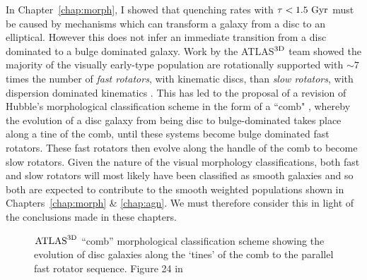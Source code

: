 In Chapter~\ref{chap:morph}, I showed that quenching rates with $\tau < 1.5~\rm{Gyr}$ must be caused by mechanisms which can transform a galaxy from a disc to an elliptical. However this does not infer an immediate transition from a disc dominated to a bulge dominated galaxy. Work by the \textsc{ATLAS}$^{\rm{3D}}$ team \citep{cappellari11} showed the majority of the visually early-type population are rotationally supported \citep{emsellem11} with $\sim7$ times the number of \emph{fast rotators}, with kinematic discs, than \emph{slow rotators}, with dispersion dominated kinematics \citep[see][]{cappellari07, emsellem07}.  This has led to the proposal of a revision of Hubble's morphological classification scheme in the form of a ``comb" \citep[see Figure~\ref{fig:atlascomb}, originally from][]{cappellari16}, whereby the evolution of a disc galaxy from being disc to bulge-dominated takes place along a tine of the comb, until these systems become bulge dominated fast rotators. These fast rotators then evolve along the handle of the comb to become slow rotators. Given the nature of the visual morphology classifications, both fast and slow rotators will most likely have been classified as smooth galaxies and so both are expected to contribute to the smooth weighted populations shown in Chapters~\ref{chap:morph} \& \ref{chap:agn}. We must therefore consider this in light of the conclusions made in these chapters. 


\begin{figure}
\caption[$\rm{ATLAS}^{\rm{3D}}$ ``comb'' morphological classification scheme from Cappellari (2016)]{$\rm{ATLAS}^{\rm{3D}}$ ``comb'' morphological classification scheme showing the evolution of disc galaxies along the `tines' of the comb to the parallel fast rotator sequence. Figure 24 in \cite{cappellari16}}
\label{fig:atlascomb}
\end{figure}

